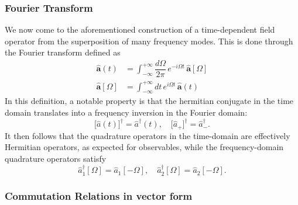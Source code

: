 \subsubsection{Fourier Transform}
We now come to the aforementioned construction of a time-dependent field operator from the superposition of many frequency modes. This is done through the Fourier transform defined as
\begin{equation}
  \begin{split}
    \mathbf{\hat{a}}(t) &=\int_{-\infty}^{+\infty}  \dfrac{d\Omega}{2\pi} \, e^{-i\Omega t} \, \mathbf{\hat{a}}[\Omega] \\
    \mathbf{\hat{a}}[\Omega] &=\int_{-\infty}^{+\infty}  dt \, e^{i\Omega t} \, \mathbf{\hat{a}}(t)
  \end{split}
\end{equation}
In this definition, a notable property is that the hermitian conjugate in the time domain translates into a frequency inversion in the Fourier domain:
\begin{equation}
   \Big[\hat{a}(t)\Big]^{\dagger} = \hat{a}^\dagger(t),  \quad
   \Big[\hat{a}_+\Big]^{\dagger}  = \hat{a}^\dagger_-.
\end{equation}
It then follows that the quadrature operators in the time-domain are effectively Hermitian operators, as expected for observables, while the frequency-domain quadrature operators satisfy
\begin{equation}
   \hat{a}^\dagger_1[\Omega]  = \hat{a}_1[-\Omega], \quad
   \hat{a}^\dagger_2[\Omega]  = \hat{a}_2[-\Omega]. 
\end{equation}

\subsubsection{Commutation Relations in vector form}


